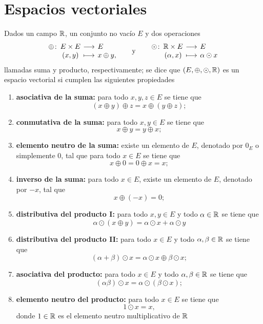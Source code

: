 \documentclass[a4,11pt]{aleph-notas}
\begin{document}
\encabezado

\section{Espacios vectoriales}

\begin{defi}
    Dados un campo $\mathbb{R}$, un conjunto no vacío $E$ y dos operaciones
    \[
        \funcion{\oplus}{E\times E}{E}{(x,y)}{x\oplus y,}
        \texty
        \funcion{\odot}{\R\times E}{E}{(\alpha,x)}{\alpha\odot x}
    \]
    llamadas suma y producto, respectivamente; se dice que $(E,\oplus,\odot,\mathbb{R})$ es un espacio vectorial si cumplen las siguientes propiedades
    \begin{enumerate}
    \item \textbf{asociativa de la suma:}
        para todo $x,y,z\in E$ se tiene que
        \[
            (x \oplus y) \oplus z = x \oplus (y \oplus z);
        \]
    \item \textbf{conmutativa de la suma:}
        para todo $x,y\in E$ se tiene que
        \[
            x \oplus y = y \oplus x;
        \]
    \item \textbf{elemento neutro de la suma:}
        existe un elemento de $E$, denotado por $0_E$ o simplemente $0$, tal que para todo $x\in E$ se tiene que 
        \[
            x \oplus 0 = 0 \oplus x = x;
        \]
    \item \textbf{inverso de la suma:}
        para todo $x\in E$, existe un elemento de $E$, denotado por $-x$, tal que
        \[
            x \oplus (-x)= 0;
        \]
    \item \textbf{distributiva del producto I:}
        para todo $x,y\in E$ y todo $\alpha\in \mathbb{R}$ se tiene que
        \[
            \alpha\odot (x \oplus y)=\alpha\odot x + \alpha\odot y
        \]
    \item \textbf{distributiva del producto II:}
        para todo $x\in E$ y todo $\alpha,\beta\in \mathbb{R}$ se tiene que
        \[
            (\alpha+\beta)\odot x=\alpha\odot x \oplus \beta\odot x;
        \]
    \item \textbf{asociativa del producto:}
        para todo $x\in E$ y todo $\alpha,\beta\in \mathbb{R}$ se tiene que
        \[
            (\alpha\beta)\odot x=\alpha\odot(\beta\odot x);
        \]
    \item \textbf{elemento neutro del producto:}
        para todo $x\in E$ se tiene que
        \[
            1\odot x=x,
        \]
        donde $1\in\mathbb{R}$ es el elemento neutro multiplicativo de $\mathbb{R}$
    \end{enumerate}
\end{defi}
\end{document}
